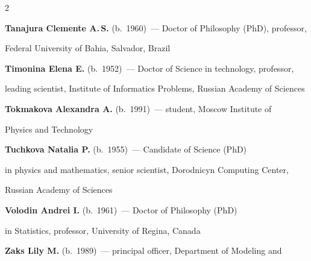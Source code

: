 \begin{multicols}{2}
\vspace*{4pt}



\noindent

\textbf{Tanajura Clemente A.\,S.}  (b.\ 1960)~--- Doctor of Philosophy (PhD), professor, 

Federal University of Bahia, Salvador, Brazil



\vspace*{4pt}



\noindent

\textbf{Timonina Elena E.} (b.\ 1952)~--- Doctor of Science in technology, professor,

leading scientist, Institute of Informatics Problems,  Russian Academy of Sciences



\vspace*{4pt}



\noindent

\textbf{Tokmakova Alexandra A.} (b.\ 1991)~--- student, Moscow Institute of

Physics and Technology



\vspace*{4pt}



\noindent

\textbf{Tuchkova Natalia P.} (b.\ 1955)~--- Candidate of Science (PhD) 

in physics and mathematics, senior scientist, Dorodnicyn Computing Center, 

Russian Academy of Sciences



\vspace*{4pt}



\noindent

\textbf{Volodin Andrei I.} (b.\ 1961)~--- Doctor of Philosophy (PhD)

in Statistics, professor, University of Regina, Canada





\vspace*{4pt}





\noindent

\textbf{Zaks Lily M.} (b.\ 1989)~--- principal officer, Department of Modeling and 


\end{multicols}
